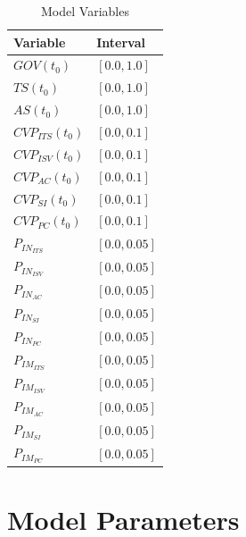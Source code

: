 \begin{table}[t]
	\centering
	\begin{tabular}{ll}
			\toprule 
			\footnotesize \textbf{Variable} & \footnotesize \textbf{Interval}\\ \midrule
			\footnotesize $GOV(t_0)$ & \footnotesize $[0.0,1.0]$ \\
			\footnotesize $TS(t_0)$ & \footnotesize $[0.0,1.0]$ \\
			\footnotesize $AS(t_0)$ & \footnotesize $[0.0,1.0]$ \\ \midrule
			\footnotesize $CVP_{ITS}(t_0)$ & \footnotesize $[0.0,0.1]$ \\
			\footnotesize $CVP_{ISV}(t_0)$ & \footnotesize $[0.0,0.1]$ \\
			\footnotesize $CVP_{AC}(t_0)$ & \footnotesize $[0.0,0.1]$ \\
			\footnotesize $CVP_{SI}(t_0)$ & \footnotesize $[0.0,0.1]$ \\
			\footnotesize $CVP_{PC}(t_0)$ & \footnotesize $[0.0,0.1]$ \\ \midrule
			\footnotesize $P_{IN_{ITS}}$ & \footnotesize $[0.0,0.05]$ \\
			\footnotesize $P_{IN_{ISV}}$ & \footnotesize $[0.0,0.05]$ \\
			\footnotesize $P_{IN_{AC}}$ & \footnotesize $[0.0,0.05]$ \\
			\footnotesize $P_{IN_{SI}}$ & \footnotesize $[0.0,0.05]$ \\
			\footnotesize $P_{IN_{PC}}$ & \footnotesize $[0.0,0.05]$ \\ \midrule
			\footnotesize $P_{IM_{ITS}}$ & \footnotesize $[0.0,0.05]$ \\
			\footnotesize $P_{IM_{ISV}}$ & \footnotesize $[0.0,0.05]$ \\
			\footnotesize $P_{IM_{AC}}$ & \footnotesize $[0.0,0.05]$ \\
			\footnotesize $P_{IM_{SI}}$ & \footnotesize $[0.0,0.05]$ \\
			\footnotesize $P_{IM_{PC}}$ & \footnotesize $[0.0,0.05]$ \\\bottomrule
	\end{tabular}
	\caption{Model Variables}
	\label{tab:mvar}
\end{table}

\section{Model Parameters}\label{ch:sfd:mp}


